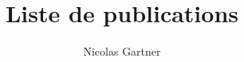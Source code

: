 \documentclass[11pt,a4paper]{article}
\author{Nicolas Gartner}
\title{Liste de publications}
\date{ }
\begin{document}
\maketitle
\nocite{*}

\end{document}
